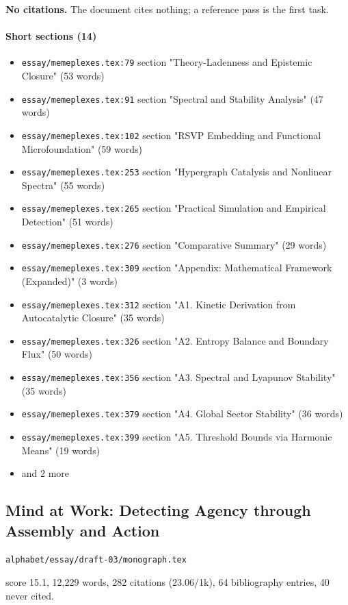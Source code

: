 \documentclass[11pt]{article}
\newcommand{\loc}[1]{{\small\color{muted}\texttt{#1}}}
\begin{document}
\textbf{No citations.} The document cites nothing; a reference pass is the first task.

\paragraph{Short sections (14)}
\begin{itemize}
\item \loc{essay/\allowbreak{}memeplexes.tex:79} section "Theory-Ladenness and Epistemic Closure" (53 words)
\item \loc{essay/\allowbreak{}memeplexes.tex:91} section "Spectral and Stability Analysis" (47 words)
\item \loc{essay/\allowbreak{}memeplexes.tex:102} section "RSVP Embedding and Functional Microfoundation" (59 words)
\item \loc{essay/\allowbreak{}memeplexes.tex:253} section "Hypergraph Catalysis and Nonlinear Spectra" (55 words)
\item \loc{essay/\allowbreak{}memeplexes.tex:265} section "Practical Simulation and Empirical Detection" (51 words)
\item \loc{essay/\allowbreak{}memeplexes.tex:276} section "Comparative Summary" (29 words)
\item \loc{essay/\allowbreak{}memeplexes.tex:309} section "Appendix: Mathematical Framework (Expanded)" (3 words)
\item \loc{essay/\allowbreak{}memeplexes.tex:312} section "A1. Kinetic Derivation from Autocatalytic Closure" (35 words)
\item \loc{essay/\allowbreak{}memeplexes.tex:326} section "A2. Entropy Balance and Boundary Flux" (50 words)
\item \loc{essay/\allowbreak{}memeplexes.tex:356} section "A3. Spectral and Lyapunov Stability" (35 words)
\item \loc{essay/\allowbreak{}memeplexes.tex:379} section "A4. Global Sector Stability" (36 words)
\item \loc{essay/\allowbreak{}memeplexes.tex:399} section "A5. Threshold Bounds via Harmonic Means" (19 words)
\item[] {\color{muted}\small and 2 more}
\end{itemize}
\subsection{Mind at Work: Detecting Agency through Assembly and Action}
\loc{alphabet/\allowbreak{}essay/\allowbreak{}draft-03/\allowbreak{}monograph.tex}\par
score 15.1, 12,229 words, 282 citations (23.06/1k), 64 bibliography entries, 40 never cited.
\end{document}

